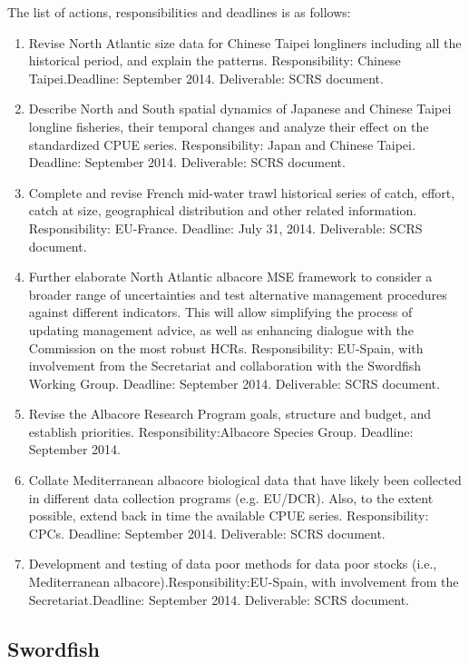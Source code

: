 \documentclass[a4paper,10pt]{article}
\begin{document}
The list of actions, responsibilities and deadlines is as follows:
\begin{enumerate}[1.]
\item	Revise North Atlantic size data for Chinese Taipei longliners including all the historical period, and explain the patterns. 
		Responsibility: Chinese Taipei.Deadline: September 2014. Deliverable: SCRS document.
\item	Describe North and South spatial dynamics of Japanese and Chinese Taipei longline fisheries, their temporal changes and analyze their effect on the standardized CPUE series.
		Responsibility: Japan and Chinese Taipei. Deadline: September 2014. Deliverable: SCRS document.
\item	Complete and revise French mid-water trawl historical series of catch, effort, catch at size, geographical distribution and other related information.
		Responsibility: EU-France. Deadline: July 31, 2014. Deliverable: SCRS document.
\item	Further elaborate North Atlantic albacore MSE framework to consider a broader range of uncertainties and test alternative management procedures against different indicators. 
This will allow simplifying the process of updating management advice, as well as enhancing dialogue with the Commission on the most robust HCRs.
	Responsibility: EU-Spain, with involvement from the Secretariat and collaboration with the Swordfish Working Group. Deadline: September 2014. Deliverable: SCRS document.
\item	Revise the Albacore Research Program goals, structure and budget, and establish priorities. Responsibility:Albacore Species Group. Deadline: September 2014.
\item	Collate Mediterranean albacore biological data that have likely been collected in different data collection programs (e.g. EU/DCR). Also, to the extent possible, extend back in time the available CPUE series. Responsibility: CPCs. Deadline: September 2014. Deliverable: SCRS document.
\item	Development and testing of data poor methods for data poor stocks (i.e., Mediterranean albacore).Responsibility:EU-Spain, with involvement from the Secretariat.Deadline: September 2014. Deliverable: SCRS document.
\end{enumerate}


\newpage
\subsection{Swordfish}
\end{document}
